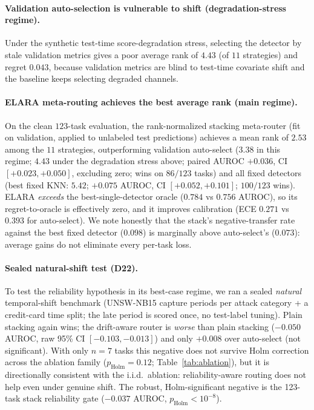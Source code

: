 \documentclass[10pt,conference]{IEEEtran}
\newcommand{\systemu}{ELARA}
\begin{document}
\paragraph{Validation auto-selection is vulnerable to shift (degradation-stress
regime).} Under the synthetic test-time score-degradation stress, selecting the
detector by stale validation metrics gives a poor average rank of \textbf{$4.43$}
(of $11$ strategies) and regret \textbf{$0.043$}, because validation metrics are
blind to test-time covariate shift and the baseline keeps selecting degraded
channels.

\paragraph{ELARA meta-routing achieves the best average rank (main regime).} On
the clean $123$-task evaluation, the rank-normalized stacking meta-router (fit on
validation, applied to unlabeled test predictions) achieves a mean rank of
\textbf{$2.53$} among the $11$ strategies, outperforming validation auto-select
(\textbf{$3.38$} in this regime; $4.43$ under the degradation stress above; paired
AUROC \textbf{$+0.036$}, CI $[+0.023,+0.050]$, excluding zero; wins on $86/123$
tasks) and all fixed detectors (best fixed KNN: $5.42$; $+0.075$ AUROC, CI
$[+0.052,+0.101]$; $100/123$ wins). \systemu{} \emph{exceeds} the best-single-detector
oracle ($0.784$ vs $0.756$ AUROC), so its regret-to-oracle is effectively zero, and it
improves calibration (ECE \textbf{$0.271$} vs \textbf{$0.393$} for auto-select). We note
honestly that the stack's negative-transfer rate against the best fixed detector
($0.098$) is marginally above auto-select's ($0.073$): average gains do not eliminate
every per-task loss.

\paragraph{Sealed natural-shift test (D22).} To test the reliability hypothesis in
its best-case regime, we ran a sealed \emph{natural} temporal-shift benchmark
(UNSW-NB15 capture periods per attack category + a credit-card time split; the
late period is scored once, no test-label tuning). Plain stacking again wins; the
drift-aware router is \emph{worse} than plain stacking ($-0.050$ AUROC, raw 95\% CI
$[-0.103,-0.013]$) and only $+0.008$ over auto-select (not significant). With only
$n{=}7$ tasks this negative does not survive Holm correction across the ablation
family ($p_{\mathrm{Holm}}{=}0.12$; Table~\ref{tab:ablation}), but it is directionally
consistent with the i.i.d.\ ablation: reliability-aware routing does not help even
under genuine shift. The robust, Holm-significant negative is the 123-task stack
reliability gate ($-0.037$ AUROC, $p_{\mathrm{Holm}}{<}10^{-8}$).
\end{document}
